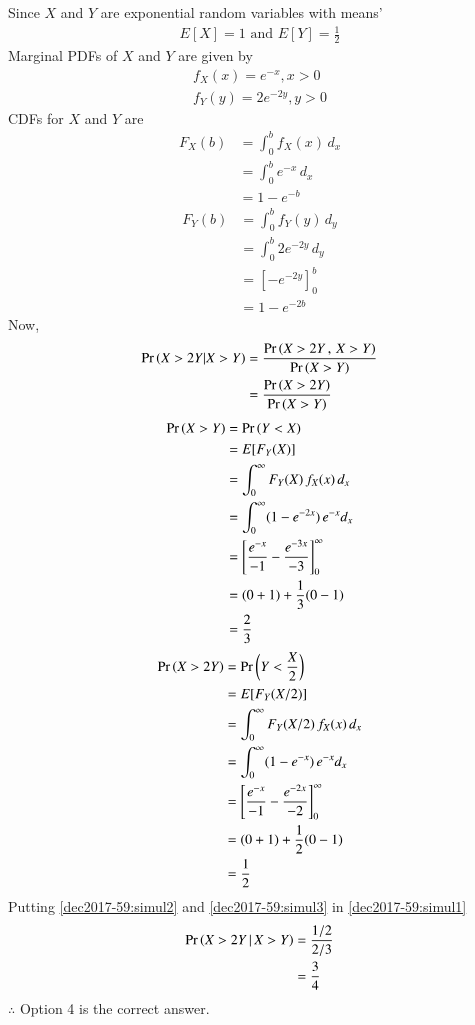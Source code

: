 Since $X$ and $Y$ are exponential random variables with means'
\begin{align}
    E[X] = 1 \text{ and } E[Y] = \frac{1}{2}
\end{align}
Marginal PDFs of $X$ and $Y$  are given by
\begin{align}
    f_X(x)= e^{-x} , x>0 \\
    f_Y(y) = 2e^{-2y} , y>0
\end{align}
CDFs for $X$ and $Y$ are
\begin{align}
    F_X(b) &= \int_0^b f_X(x)\,d_x\\
           &= \int_0^b  e^{-x}\,d_x\\
           &= 1-e^{-b}
\end{align}
\begin{align}
    F_Y(b) &= \int_0^b f_Y(y)\,d_y\\
           &= \int_0^b 2e^{-2y}\,d_y\\
           &= \left[-e^{-2y}\right]_0^b\\
           &= 1-e^{-2b}
\end{align}
Now,
\begin{align}
    \Pr\left(X>2Y|X>Y\right) &= \dfrac{\Pr\left(X>2Y\,,\,X>Y\right) }{\Pr\left(X>Y\right)}\\
                  &= \dfrac{\Pr\left(X>2Y\right)}{\Pr\left(X>Y\right)} \label{dec2017-59:simul1}
\end{align}
\begin{align}
    \Pr\left(X>Y\right) &= \Pr\left(Y<X\right)\\
             &= E[F_Y(X)]\\
             &= \int_0^\infty F_Y(X)\,f_X(x)\,d_x\\
             &= \int_0^\infty (1-e^{-2x})\,e^{-x}d_x\\
             &= \left[\frac{e^{-x}}{-1} - \frac{e^{-3x}}{-3}\right]_0^\infty\\
            &=(0+1)+\frac{1}{3}(0-1) \\
             &= \frac{2}{3} \label{dec2017-59:simul2}
\end{align}
\begin{align}
    \Pr\left(X>2Y\right) &= \Pr\left(Y<\frac{X}{2}\right)\\
              &= E[F_Y(X/2)]\\
              &=  \int_0^\infty F_Y(X/2)\,f_X(x)\,d_x\\
              &= \int_{0}^{\infty}(1-e^{-x})\,e^{-x}d_x\\
              &= \left[\frac{e^{-x}}{-1} - \frac{e^{-2x}}{-2}\right]_0^\infty\\
              &= (0+1) + \frac{1}{2}(0-1)\\
              &= \frac{1}{2} \label{dec2017-59:simul3}
\end{align}
Putting \eqref{dec2017-59:simul2} and \eqref{dec2017-59:simul3} in \eqref{dec2017-59:simul1}
\begin{align}
    \Pr\left(X>2Y\,|\,X>Y\right) &= \frac{1/2}{2/3}\\
                  &= \frac{3}{4}
\end{align}
$\therefore$ Option 4 is the correct answer.